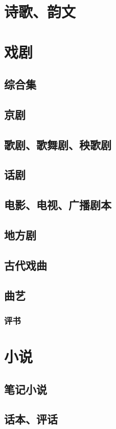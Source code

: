 \documentclass[UTF8]{../../RepresentationUniverse}
\begin{document}
\section{诗歌、韵文}


\section{戏剧}
    \subsection{综合集}
    \subsection{京剧}
    \subsection{歌剧、歌舞剧、秧歌剧}
    \subsection{话剧}
    \subsection{电影、电视、广播剧本}
    \subsection{地方剧}
    \subsection{古代戏曲}
    \subsection{曲艺}
        \subsubsection{评书}

\section{小说}
    \subsection{笔记小说}
    \subsection{话本、评话}
\end{document}

